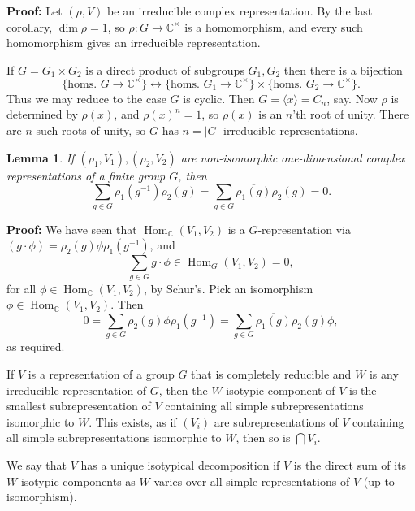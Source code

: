 \documentclass[12pt]{article}
\DeclareMathOperator{\Hom}{Hom}
\newtheorem{lemma}{Lemma}[section]
\theoremstyle{definition}
\theoremstyle{remark}
\begin{document}
\begin{adjustbox}{minipage = \columnwidth - 25.5pt, margin=1em, frame=1pt, margin=0em}
	\textbf{Proof:} Let $(\rho, V)$ be an irreducible complex representation. By the last corollary, $\dim \rho = 1$, so $\rho : G \to \mathbb{C}^{\times}$ is a homomorphism, and every such homomorphism gives an irreducible representation.

	If $G = G_1 \times G_2$ is a direct product of subgroups $G_1, G_2$ then there is a bijection
	\[
		\{\text{homs. } G \to \mathbb{C}^{\times}\} \leftrightarrow \{\text{homs. } G_1 \to \mathbb{C}^{\times}\} \times \{\text{homs. } G_2 \to \mathbb{C}^{\times}\}
	.\]
	Thus we may reduce to the case $G$ is cyclic. Then $G = \langle x \rangle = C_n$, say. Now $\rho$ is determined by $\rho(x)$, and $\rho(x)^{n} = 1$, so $\rho(x)$ is an $n$'th root of unity. There are $n$ such roots of unity, so $G$ has $n = |G|$ irreducible representations.
\end{adjustbox}

\begin{lemma}
	If $(\rho_1, V_1), (\rho_2, V_2)$ are non-isomorphic one-dimensional complex representations of a finite group $G$, then
	\[
		\sum_{g \in G}\rho_1(g^{-1}) \rho_2(g) = \sum_{g \in G}\overline{\rho_1(g)}\rho_2(g) = 0
	.\]
\end{lemma}

\begin{adjustbox}{minipage = \columnwidth - 25.5pt, margin=1em, frame=1pt, margin=0em}
	\textbf{Proof:} We have seen that $\Hom_{\mathbb{C}}(V_1, V_2)$ is a $G$-representation via $(g \cdot \phi) = \rho_2(g) \phi \rho_1(g^{-1})$, and
	\[
		\sum_{g \in G}g \cdot \phi \in \Hom_G(V_1, V_2) = 0
	,\]
	for all $\phi \in  \Hom_{\mathbb{C}}(V_1, V_2)$, by Schur's. Pick an isomorphism $\phi \in \Hom_{\mathbb{C}}(V_1, V_2)$. Then
	\[
		0 = \sum_{g \in G}\rho_2(g) \phi \rho_1(g^{-1}) = \sum_{g \in G} \overline{\rho_1(g)}\rho_2(g) \phi
	,\]
	as required.
\end{adjustbox}

If $V$ is a representation of a group $G$ that is completely reducible and $W$ is any irreducible representation of $G$, then the $W$-isotypic component of $V$ is the smallest subrepresentation of $V$ containing all simple subrepresentations isomorphic to $W$. This exists, as if $(V_i)$ are subrepresentations of $V$ containing all simple subrepresentations isomorphic to $W$, then so is $\bigcap V_i$.

We say that $V$ has a unique isotypical decomposition if $V$ is the direct sum of its $W$-isotypic components as $W$ varies over all simple representations of $V$ (up to isomorphism).
\end{document}
